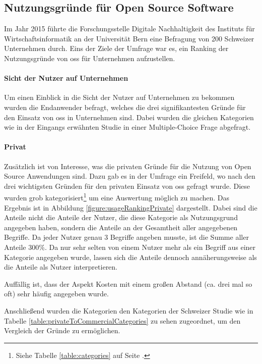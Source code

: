 \documentclass[a4paper]{article}
\begin{document}
            
        \subsection{Nutzungsgründe für Open Source Software}
            \label{section:usageReasons}
            Im Jahr 2015 führte die Forschungsstelle Digitale Nachhaltigkeit des Instituts für Wirtschaftsinformatik an der Universität Bern eine Befragung von 200 Schweizer Unternehmen durch\cite{oss:studie}. Eins der Ziele der Umfrage war es, ein Ranking der Nutzungsgründe von \gls{oss} für Unternehmen aufzustellen.

            \paragraph{Sicht der Nutzer auf Unternehmen}
                Um einen Einblick in die Sicht der Nutzer auf Unternehmen zu bekommen wurden die Endanwender befragt, welches die drei signifikantesten Gründe für den Einsatz von \gls{oss} in Unternehmen sind. Dabei wurden die gleichen Kategorien wie in der Eingangs erwähnten Studie in einer Multiple-Choice Frage abgefragt.

            \paragraph{Privat}
                Zusätzlich ist von Interesse, was die privaten Gründe für die Nutzung von Open Source Anwendungen sind. Dazu gab es in der Umfrage ein Freifeld, wo nach den drei wichtigsten Gründen für den privaten Einsatz von \gls{oss} gefragt wurde. Diese wurden grob kategorisiert\footnote{Siehe Tabelle \ref{table:categories} auf Seite \pageref{table:categories}.} um eine Auswertung möglich zu machen. Das Ergebnis ist in Abbildung \ref{figure:usageRankingPrivate} dargestellt. Dabei sind die Anteile nicht die Anteile der Nutzer, die diese Kategorie als Nutzungsgrund angegeben haben, sondern die Anteile an der Gesamtheit aller angegebenen Begriffe. Da jeder Nutzer genau 3 Begriffe angeben musste, ist die Summe aller Anteile $300\%$. Da nur sehr selten von einem Nutzer mehr als ein Begriff aus einer Kategorie angegeben wurde, lassen sich die Anteile dennoch annäherungsweise als die Anteile als Nutzer interpretieren.
                
                Auffällig ist, dass der Aspekt Kosten mit einem großen Abstand (ca. drei mal so oft) sehr häufig angegeben wurde.
                
                Anschließend wurden die Kategorien den Kategorien der Schweizer Studie wie in Tabelle \ref{table:privateToCommercialCategories} zu sehen zugeordnet, um den Vergleich der Gründe zu ermöglichen.
                
\end{document}
